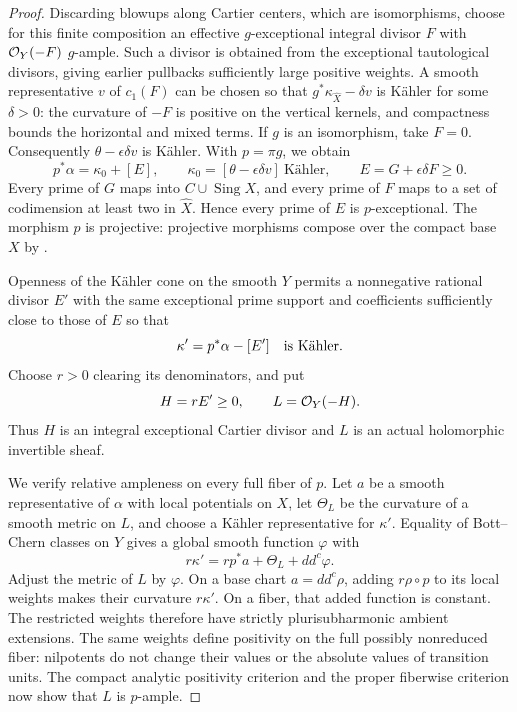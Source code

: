 \begin{proof}
Discarding blowups along Cartier centers, which are isomorphisms, choose
for this finite composition an effective
\(g\)-exceptional integral divisor \(F\) with \(\mathcal O_Y(-F)\)
\(g\)-ample.  Such a divisor is obtained from the exceptional
tautological divisors, giving earlier pullbacks sufficiently large
positive weights.  A smooth representative \(v\) of \(c_1(F)\) can be
chosen so that \(g^*\kappa_{\widehat X}-\delta v\) is K\"ahler for some
\(\delta>0\): the curvature of \(-F\) is positive on the vertical
kernels, and compactness bounds the horizontal and mixed terms.  If
\(g\) is an isomorphism, take \(F=0\).  Consequently
\(\theta-\epsilon\delta v\) is K\"ahler.  With \(p=\pi g\), we obtain
\begin{equation}\label{eq:null-exceptional-decomposition}
 p^*\alpha=\kappa_0+[E],\qquad
 \kappa_0=[\theta-\epsilon\delta v]\ \text{K\"ahler},\qquad
 E=G+\epsilon\delta F\geq0 .
\end{equation}
Every prime of \(G\) maps into \(C\cup\operatorname{Sing}X\), and every
prime of \(F\) maps to a set of codimension at least two in
\(\widehat X\).  Hence every prime of \(E\) is \(p\)-exceptional.
The morphism \(p\) is projective: projective morphisms compose over the
compact base \(X\) by \cite[Remark~2.11]{DasHaconPaun2024}.

Openness of the K\"ahler cone on the smooth \(Y\) permits a nonnegative
rational divisor \(E'\) with the same exceptional prime support and
coefficients sufficiently close to those of \(E\) so that
\[
 \kappa'=p^*\alpha-[E']\quad\hbox{is K\"ahler}.
\]
Choose \(r>0\) clearing its denominators, and put
\begin{equation}\label{eq:null-positive-line}
 H=rE'\geq0,\qquad L=\mathcal O_Y(-H).
\end{equation}
Thus \(H\) is an integral exceptional Cartier divisor and \(L\) is an
actual holomorphic invertible sheaf.

We verify relative ampleness on every full fiber of \(p\).  Let \(a\)
be a smooth representative of \(\alpha\) with local potentials on \(X\),
let \(\Theta_L\) be the curvature of a smooth metric on \(L\), and choose
a K\"ahler representative for \(\kappa'\).  Equality of Bott--Chern
classes on \(Y\) gives a global smooth function \(\varphi\) with
\[
 r\kappa'=r p^*a+\Theta_L+dd^c\varphi .
\]
Adjust the metric of \(L\) by \(\varphi\).  On a base chart
\(a=dd^c\rho\), adding \(r\rho\circ p\) to its local weights makes their
curvature \(r\kappa'\).  On a fiber, that added function is constant.
The restricted weights therefore have strictly plurisubharmonic ambient
extensions.  The same weights define positivity on the full possibly
nonreduced fiber: nilpotents do not change their values or the absolute
values of transition units.  The compact analytic positivity criterion
and the proper fiberwise criterion
\cite[Definition~2.8, Corollary~1.12, and Remark~3.2]{Fujino2026Fujiki}
now show that \(L\) is \(p\)-ample.


\end{proof}
